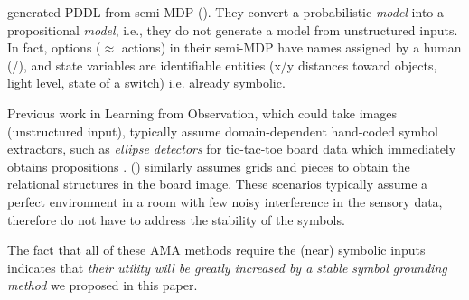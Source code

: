 \citeauthor{KonidarisKL14} generated PDDL from
semi-MDP (\citeyear{KonidarisKL14}).
% 
They convert a probabilistic \emph{model} into a propositional \emph{model},
i.e., they do not generate a model from unstructured inputs.
In fact, options ($\approx$ actions) in their semi-MDP have names assigned by a human (/),
and state variables are identifiable entities
(x/y distances toward objects, light level, state of a switch) i.e. already symbolic.


Previous work in Learning from Observation, which could take images (unstructured input),
typically assume domain-dependent hand-coded symbol extractors,
such as \emph{ellipse detectors} for tic-tac-toe board data
which immediately obtains propositions \cite{BarbuNS10}.
\citeauthor{Kaiser12} (\citeyear{Kaiser12}) similarly assumes grids and pieces
to obtain the relational structures in the board image.
These scenarios typically assume a perfect environment in a room with few noisy interference in the sensory data,
therefore do not have to address the stability of the symbols.

The fact that all of these AMA methods require the (near) symbolic inputs indicates
that \emph{their utility will be greatly increased by a stable symbol grounding method} we proposed in this paper.



